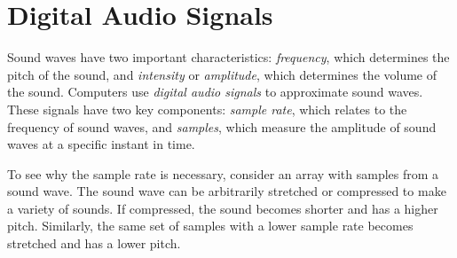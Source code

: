 
\section*{Digital Audio Signals} %

Sound waves have two important characteristics: \emph{frequency}, which determines the pitch of the sound, and \emph{intensity} or \emph{amplitude}, which determines the volume of the sound.
Computers use \emph{digital audio signals} to approximate sound waves.
These signals have two key components: \emph{sample rate}, which relates to the frequency of sound waves, and \emph{samples}, which measure the amplitude of sound waves at a specific instant in time.

To see why the sample rate is necessary, consider an array with samples from a sound wave.
The sound wave can be arbitrarily stretched or compressed to make a variety of sounds.
If compressed, the sound becomes shorter and has a higher pitch.
Similarly, the same set of samples with a lower sample rate becomes stretched and has a lower pitch.

